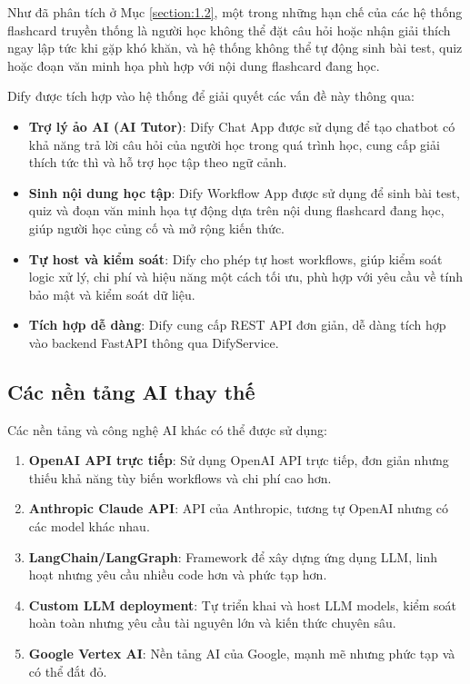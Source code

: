 \documentclass[../DoAn.tex]{subfiles}
\begin{document}
Như đã phân tích ở Mục \ref{section:1.2}, một trong những hạn chế của các hệ thống flashcard truyền thống là người học không thể đặt câu hỏi hoặc nhận giải thích ngay lập tức khi gặp khó khăn, và hệ thống không thể tự động sinh bài test, quiz hoặc đoạn văn minh họa phù hợp với nội dung flashcard đang học.

Dify được tích hợp vào hệ thống để giải quyết các vấn đề này thông qua:

\begin{itemize}
    \item \textbf{Trợ lý ảo AI (AI Tutor)}: Dify Chat App được sử dụng để tạo chatbot có khả năng trả lời câu hỏi của người học trong quá trình học, cung cấp giải thích tức thì và hỗ trợ học tập theo ngữ cảnh.
    
    \item \textbf{Sinh nội dung học tập}: Dify Workflow App được sử dụng để sinh bài test, quiz và đoạn văn minh họa tự động dựa trên nội dung flashcard đang học, giúp người học củng cố và mở rộng kiến thức.
    
    \item \textbf{Tự host và kiểm soát}: Dify cho phép tự host workflows, giúp kiểm soát logic xử lý, chi phí và hiệu năng một cách tối ưu, phù hợp với yêu cầu về tính bảo mật và kiểm soát dữ liệu.
    
    \item \textbf{Tích hợp dễ dàng}: Dify cung cấp REST API đơn giản, dễ dàng tích hợp vào backend FastAPI thông qua DifyService.
\end{itemize}

\subsection{Các nền tảng AI thay thế}

Các nền tảng và công nghệ AI khác có thể được sử dụng:

\begin{enumerate}
    \item \textbf{OpenAI API trực tiếp}: Sử dụng OpenAI API trực tiếp, đơn giản nhưng thiếu khả năng tùy biến workflows và chi phí cao hơn.
    
    \item \textbf{Anthropic Claude API}: API của Anthropic, tương tự OpenAI nhưng có các model khác nhau.
    
    \item \textbf{LangChain/LangGraph}: Framework để xây dựng ứng dụng LLM, linh hoạt nhưng yêu cầu nhiều code hơn và phức tạp hơn.
    
    \item \textbf{Custom LLM deployment}: Tự triển khai và host LLM models, kiểm soát hoàn toàn nhưng yêu cầu tài nguyên lớn và kiến thức chuyên sâu.
    
    \item \textbf{Google Vertex AI}: Nền tảng AI của Google, mạnh mẽ nhưng phức tạp và có thể đắt đỏ.
\end{enumerate}
\end{document}

